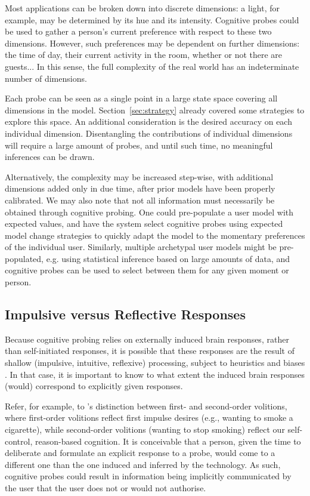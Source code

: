 Most applications can be broken down into discrete dimensions: a light, for example, may be determined by its hue and its intensity. Cognitive probes could be used to gather a person's current preference with respect to these two dimensions. However, such preferences may be dependent on further dimensions: the time of day, their current activity in the room, whether or not there are guests... In this sense, the full complexity of the real world has an indeterminate number of dimensions.

Each probe can be seen as a single point in a large state space covering all dimensions in the model. Section~\ref{sec:strategy} already covered some strategies to explore this space. An additional consideration is the desired accuracy on each individual dimension. Disentangling the contributions of individual dimensions will require a large amount of probes, and until such time, no meaningful inferences can be drawn.

Alternatively, the complexity may be increased step-wise, with additional dimensions added only in due time, after prior models have been properly calibrated. We may also note that not all information must necessarily be obtained through cognitive probing. One could pre-populate a user model with expected values, and have the system select cognitive probes using expected model change strategies to quickly adapt the model to the momentary preferences of the individual user. Similarly, multiple archetypal user models might be pre-populated, e.g. using statistical inference based on large amounts of data, and cognitive probes can be used to select between them for any given moment or person. 


\subsection{Impulsive versus Reflective Responses}
\label{sec:impulsive}

Because cognitive probing relies on externally induced brain responses, rather than self-initiated responses, it is possible that these responses are the result of shallow (impulsive, intuitive, reflexive) processing, subject to heuristics and biases \cite{kahneman2011fastslow}. In that case, it is important to know to what extent the induced brain responses (would) correspond to explicitly given responses.

Refer, for example, to 's distinction between first- and second-order volitions, where first-order volitions reflect first impulse desires (e.g., wanting to smoke a cigarette), while second-order volitions (wanting to stop smoking) reflect our self-control, reason-based cognition. It is conceivable that a person, given the time to deliberate and formulate an explicit response to a probe, would come to a different one than the one induced and inferred by the technology. As such, cognitive probes could result in information being implicitly communicated by the user that the user does not or would not authorise. 

